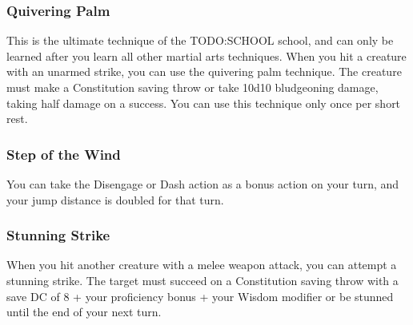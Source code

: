 \subsubsection{Quivering Palm} \label{mtec::quiveringpalm}
This is the ultimate technique of the TODO:SCHOOL school, and can only be learned after you learn all other martial arts techniques.
When you hit a creature with an unarmed strike, you can use the quivering palm technique.
The creature must make a Constitution saving throw or take 10d10 bludgeoning damage, taking half damage on a success.
You can use this technique only once per short rest.

\subsubsection{Step of the Wind} \label{mtec::stepofthewind}
You can take the Disengage or Dash action as a bonus action on your turn, and your jump distance is doubled for that turn.

\subsubsection{Stunning Strike} \label{mtec::stunningstrike}
When you hit another creature with a melee weapon attack, you can attempt a stunning strike.
The target must succeed on a Constitution saving throw with a save DC of 8 + your proficiency bonus + your Wisdom modifier or be stunned until the end of your next turn.
